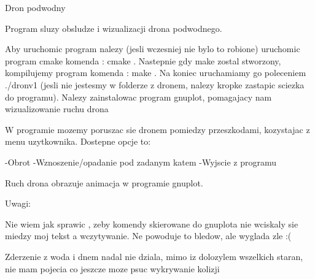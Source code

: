 Dron podwodny

Program sluzy obsludze i wizualizacji drona podwodnego.

Aby uruchomic program nalezy (jesli wczesniej nie bylo to robione) uruchomic program cmake komenda \+: \textquotesingle{} cmake . \textquotesingle{} Nastepnie gdy make zostal stworzony, kompilujemy program komenda \+: \textquotesingle{} make \textquotesingle{} . Na koniec uruchamiamy go poleceniem \textquotesingle{} ./dronv1 \textquotesingle{} (jesli nie jestesmy w folderze z dronem, nalezy kropke zastapic sciezka do programu). Nalezy zainstalowac program gnuplot, pomagajacy nam wizualizowanie ruchu drona

W programie mozemy poruszac sie dronem pomiedzy przeszkodami, kozystajac z menu uzytkownika. Dostepne opcje to\+:

-\/\+Obrot -\/\+Wznoszenie/opadanie pod zadanym katem -\/\+Wyjscie z programu

Ruch drona obrazuje animacja w programie gnuplot.

Uwagi\+:
\begin{DoxyEnumerate}
\item Nie wiem jak sprawic , zeby komendy skierowane do gnuplota nie wciskaly sie miedzy moj tekst a wczytywanie. Ne powoduje to bledow, ale wyglada zle \+:(
\item Zderzenie z woda i dnem nadal nie dziala, mimo iz dolozylem wszelkich staran, nie mam pojecia co jeszcze moze psuc wykrywanie kolizji 
\end{DoxyEnumerate}